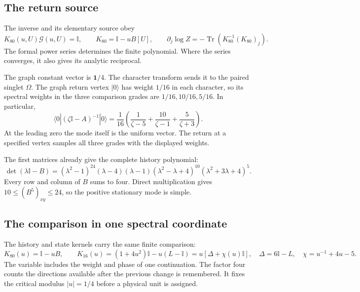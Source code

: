 \documentclass[aps,prx,onecolumn,10pt,notitlepage,nofootinbib,longbibliography]{revtex4-2}
\numberwithin{equation}{section}
\numberwithin{table}{section}
\newcommand{\Id}{\mathbb I}
\newcommand{\Tr}{\operatorname{Tr}}
\begin{document}
\subsection{The return source}
The inverse and its elementary source obey
\begin{equation}
 K_{80}(u,U)\mathcal G(u,U)=\Id,\qquad
 K_{80}=\Id-uB[U],\qquad
 \partial_j\log Z=-\Tr(K_{80}^{-1}(K_{80})_j).
 \label{eq:lawinverse}
\end{equation}
The formal power series determines the finite polynomial. Where the series
converges, it also gives its analytic reciprocal.

The graph constant vector is $\mathbf1/4$. The character transform sends it to
the paired singlet $\Omega$. The graph return vertex $\lvert0\rangle$ has weight $1/16$
in each character, so its spectral weights in the three comparison grades
are $1/16,10/16,5/16$. In particular,
\begin{equation}
 \langle0|(\zeta\Id-A)^{-1}|0\rangle
 =\frac1{16}\left(\frac1{\zeta-5}
 +\frac{10}{\zeta-1}+\frac5{\zeta+3}\right).
 \label{eq:returnvertex}
\end{equation}
At the leading zero the mode itself is the uniform vector. The return at a
specified vertex samples all three grades with the displayed weights.

The first matrices already give the complete history polynomial:
\begin{equation}
 \det(\lambda\Id-B)
 =(\lambda^2-1)^{24}(\lambda-4)(\lambda-1)
 (\lambda^2-\lambda+4)^{10}
 (\lambda^2+3\lambda+4)^5.
 \label{eq:Bspectrum}
\end{equation}
Every row and column of $B$ sums to four. Direct multiplication gives
$10\leq(B^5)_{xy}\leq24$, so the positive stationary mode is simple.

\subsection{The comparison in one spectral coordinate}
The history and state kernels carry the same finite comparison:
\begin{equation}
 K_{80}(u)=\Id-uB,\qquad
 K_{16}(u)=(1+4u^2)\Id-u(L-\Id)
          =u[\Delta+\chi(u)\Id],
 \quad \Delta=6\Id-L,\quad \chi=u^{-1}+4u-5.
 \label{eq:onekernel}
\end{equation}
The variable includes the weight and phase of one continuation. The factor
four counts the directions available after the previous change is remembered.
It fixes the critical modulus $|u|=1/4$ before a physical unit is assigned.
\end{document}
